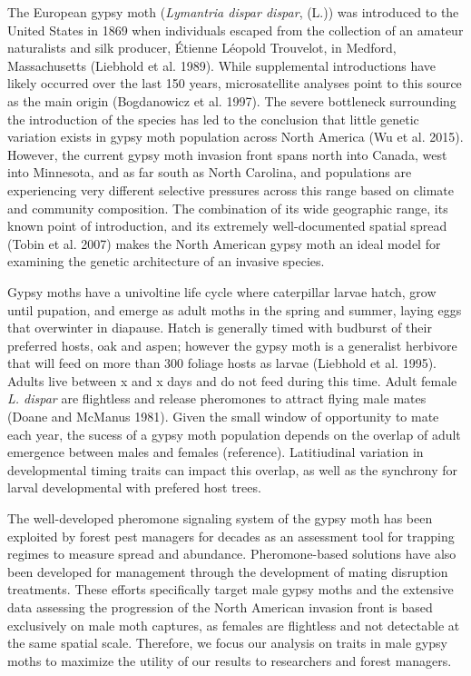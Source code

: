 \documentclass[fleqn,11pt]{wlpeerj}
\begin{document}
The European gypsy moth (\textit{Lymantria dispar dispar}, (L.)) was introduced to the United States in 1869 when individuals escaped from the collection of an amateur naturalists and silk producer, Étienne Léopold Trouvelot, in Medford, Massachusetts (Liebhold et al. 1989). While supplemental introductions have likely occurred over the last 150 years, microsatellite analyses point to this source as the main origin (Bogdanowicz et al. 1997). The severe bottleneck surrounding the introduction of the species has led to the conclusion that little genetic variation exists in gypsy moth population across North America (Wu et al. 2015). However, the current gypsy moth invasion front spans north into Canada, west into Minnesota, and as far south as North Carolina, and populations are experiencing very different selective pressures across this range based on climate and community composition. The combination of its wide geographic range, its known point of introduction, and its extremely well-documented spatial spread (Tobin et al. 2007) makes the North American gypsy moth an ideal model for examining the genetic architecture of an invasive species.
 
Gypsy moths have a univoltine life cycle where caterpillar larvae hatch, grow until pupation, and emerge as adult moths in the spring and summer, laying eggs that overwinter in diapause. Hatch is generally timed with budburst of their preferred hosts, oak and aspen; however the gypsy moth is a generalist herbivore that will feed on more than 300 foliage hosts as larvae (Liebhold et al. 1995). Adults live between x and x days and do not feed during this time. Adult female \textit{L. dispar} are flightless and release pheromones to attract flying male mates (Doane and McManus 1981). Given the small window of opportunity to mate each year, the sucess of a gypsy moth population depends on the overlap of adult emergence between males and females (reference). Latitiudinal variation in developmental timing traits can impact this overlap, as well as the synchrony for larval developmental with prefered host trees.

The well-developed pheromone signaling system of the gypsy moth has been exploited by forest pest managers for decades as an assessment tool for trapping regimes to measure spread and abundance. Pheromone-based solutions have also been developed for management through the development of mating disruption treatments. These efforts specifically target male gypsy moths and the extensive data assessing the progression of the North American invasion front is based exclusively on male moth captures, as females are flightless and not detectable at the same spatial scale. Therefore, we focus our analysis on traits in male gypsy moths to maximize the utility of our results to researchers and forest managers.
\end{document}
